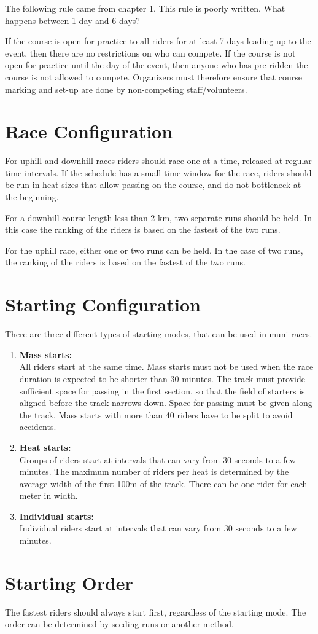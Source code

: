\begin{comment2016}
The following rule came from chapter 1.
This rule is poorly written.
What happens between 1 day and 6 days?
\end{comment2016}

If the course is open for practice to all riders for at least 7 days leading up to the event, then there are no restrictions on who can compete.
If the course is not open for practice until the day of the event, then anyone who has pre-ridden the course is not allowed to compete.
Organizers must therefore ensure that course marking and set-up are done by non-competing staff/volunteers.

\section{Race Configuration}

For uphill and downhill races riders should race one at a time, released at regular time intervals.
If the schedule has a small time window for the race, riders should be run in heat sizes that allow passing on the course, and do not bottleneck at the beginning.

For a downhill course length less than 2 km, two separate runs should be held.
In this case the ranking of the riders is based on the fastest of the two runs.

For the uphill race, either one or two runs can be held.
In the case of two runs, the ranking of the riders is based on the fastest of the two runs.

\section{Starting Configuration}

There are three different types of starting modes, that can be used in muni races.
\begin{enumerate}
\item \textbf{Mass starts:}\\
All riders start at the same time.
Mass starts must not be used when the race duration is expected to be shorter than 30 minutes.
The track must provide sufficient space for passing in the first section, so that the field of starters is aligned before the track narrows down.
Space for passing must be given along the track.
Mass starts with more than 40 riders have to be split to avoid accidents.
\item \textbf{Heat starts:}\\
Groups of riders start at intervals that can vary from 30 seconds to a few minutes.
The maximum number of riders per heat is determined by the average width of the first 100m of the track.
There can be one rider for each meter in width.
\item \textbf{Individual starts:}\\
Individual riders start at intervals that can vary from 30 seconds to a few minutes.
\end{enumerate}

\section{Starting Order}

The fastest riders should always start first, regardless of the starting mode.
The order can be determined by seeding runs or another method.
